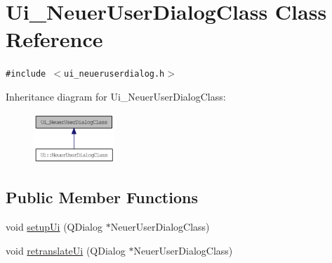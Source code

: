 \hypertarget{class_ui___neuer_user_dialog_class}{
\section{Ui\_\-NeuerUserDialogClass Class Reference}
\label{class_ui___neuer_user_dialog_class}
}
{\tt \#include $<$ui\_\-neueruserdialog.h$>$}

Inheritance diagram for Ui\_\-NeuerUserDialogClass:\nopagebreak
\begin{figure}[H]
\begin{center}
\leavevmode
\includegraphics[width=86pt]{class_ui___neuer_user_dialog_class__inherit__graph}
\end{center}
\end{figure}
\subsection*{Public Member Functions}
\begin{CompactItemize}
\item 
void \hyperlink{class_ui___neuer_user_dialog_class_a5315d1a0ab462b8545f222ea764c6d6}{setupUi} (QDialog $\ast$NeuerUserDialogClass)
\item 
void \hyperlink{class_ui___neuer_user_dialog_class_c41dc31482b964ce5ba62c50495081e8}{retranslateUi} (QDialog $\ast$NeuerUserDialogClass)
\end{CompactItemize}
